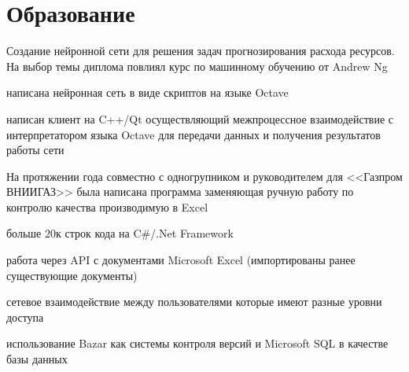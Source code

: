\documentclass[a4paper]{curricula-vitae}
\begin{document}
\begin{minipage}[t]{0.66\textwidth}
\insertspace

\section{Образование} 

Создание нейронной сети для решения задач прогнозирования расхода ресурсов. 
На выбор темы диплома повлиял курс по машинному обучению от Andrew Ng
\begin{tightitemize}
\item написана нейронная сеть в виде скриптов на языке Octave
\item написан клиент на C++/Qt осуществляющий межпроцессное взаимодействие с интерпретатором 
языка Octave для передачи данных и получения результатов работы сети
\end{tightitemize}

\insertspace

На протяжении года совместно с одногрупником и руководителем для <<Газпром ВНИИГАЗ>> была написана
программа заменяющая ручную работу по контролю качества производимую в Excel
\begin{tightitemize}
\item больше 20к строк кода на C\#/.Net Framework
\item работа через API с документами Microsoft Excel (импортированы ранее существующие документы)
\item сетевое взаимодействие между пользователями которые имеют разные уровни доступа
\item использование Bazar как системы контроля версий и Microsoft SQL в качестве базы данных
\end{tightitemize}

\insertspace

\end{minipage}%

\end{document}
